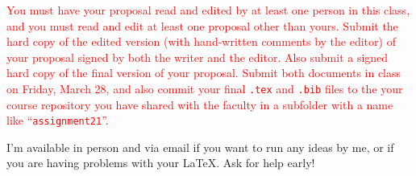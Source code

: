 \textcolor{red}{You must have your proposal read and edited by at least one person in this class,
and you must read and edit at least one proposal other than yours. 
Submit the hard copy of the edited version (with hand-written comments by the editor) 
of your proposal signed by both the writer and the editor. 
Also submit a signed hard copy of the final version of your proposal. 
Submit both documents in class on Friday, March 28, and
also commit your final {\tt .tex} and {\tt .bib} files to the your course
repository you have shared with the faculty in a subfolder 
with a name like ``{\tt assignment21}''.}

I'm available in person and via email if you want to run any ideas 
by me, or if you are having problems with your \LaTeX. Ask for help early!

